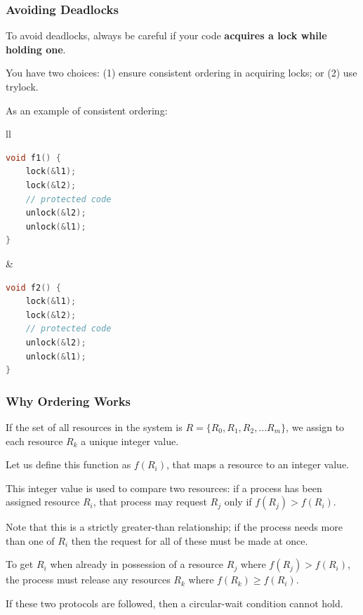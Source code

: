 \begin{frame}[fragile]
\frametitle{Avoiding Deadlocks}

To avoid deadlocks, always be careful if your code {\bf acquires a lock while holding one}.  
  
You have two choices: (1) ensure consistent ordering in acquiring locks; or (2) use trylock.

As an example of consistent ordering:
\begin{center}
\begin{tabular}{ll}
\begin{minipage}{.4\textwidth}
  \begin{lstlisting}[language=C]
void f1() {
    lock(&l1);
    lock(&l2);
    // protected code
    unlock(&l2);
    unlock(&l1);    
}
\end{lstlisting}
\end{minipage}&
\begin{minipage}{.4\textwidth}
\begin{lstlisting}[language=C]
void f2() {
    lock(&l1);
    lock(&l2);
    // protected code
    unlock(&l2);
    unlock(&l1);    
}
  \end{lstlisting}
\end{minipage}
\end{tabular}
\end{center}

\end{frame}


\begin{frame}
\frametitle{Why Ordering Works}

If the set of all resources in the system is $R = \{R_{0}, R_{1}, R_{2}, ... R_{m}\}$, we assign to each resource $R_{k}$ a unique integer value. 

Let us define this function as $f(R_{i})$, that maps a resource to an integer value. 

This integer value is used to compare two resources: if a process has been assigned resource $R_{i}$, that process may request $R_{j}$ only if $f(R_{j}) > f(R_{i})$. 

Note that this is a strictly greater-than relationship; if the process needs more than one of $R_{i}$ then the request for all of these must be made at once.

To get $R_{i}$ when already in possession of a resource $R_{j}$ where $f(R_{j}) > f(R_{i})$, the process must release any resources $R_{k}$ where $f(R_{k}) \geq f(R_{i})$. 

If these two protocols are followed, then a circular-wait condition cannot hold.


\end{frame}


